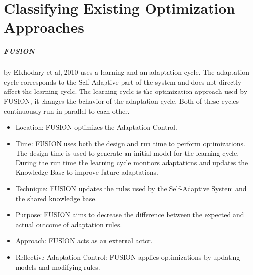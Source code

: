 \newpage
\section{Classifying Existing Optimization Approaches}
\label{ch:Existing}




\subparagraph*{FUSION}
by Elkhodary et al, 2010 \cite*{FUSION}  uses a learning and an adaptation cycle.
The adaptation cycle corresponds to the Self-Adaptive part of the system
and does not directly affect the learning cycle.
The learning cycle is the optimization approach used by FUSION,
it changes the behavior of the adaptation cycle.
Both of these cycles continuously run in parallel to each other.
\begin{itemize}
    \item Location: FUSION optimizes the Adaptation Control.
    \item Time: FUSION uses both the design and run time to perform optimizations.
    The design time is used to generate an initial model for the learning cycle.
    During the run time the learning cycle monitors adaptations
    and updates the Knowledge Base to improve future adaptations.
    \item Technique: FUSION updates the rules used by the Self-Adaptive System and the shared knowledge base.
    \item Purpose: FUSION aims to decrease the difference between the expected and actual outcome of adaptation rules.
    \item Approach: FUSION acts as an external actor.
    \item Reflective Adaptation Control: FUSION applies optimizations by updating models and modifying rules.
\end{itemize}

